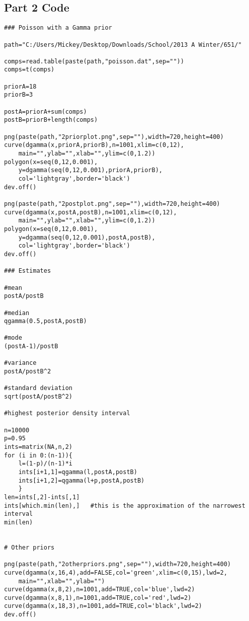 \documentclass[12pt]{article}
\begin{document}
\subsection*{Part 2 Code}
\begin{scriptsize}
\begin{verbatim}
### Poisson with a Gamma prior

path="C:/Users/Mickey/Desktop/Downloads/School/2013 A Winter/651/"

comps=read.table(paste(path,"poisson.dat",sep=""))
comps=t(comps)

priorA=18
priorB=3

postA=priorA+sum(comps)
postB=priorB+length(comps)

png(paste(path,"2priorplot.png",sep=""),width=720,height=400)
curve(dgamma(x,priorA,priorB),n=1001,xlim=c(0,12),
    main="",ylab="",xlab="",ylim=c(0,1.2))
polygon(x=seq(0,12,0.001),
    y=dgamma(seq(0,12,0.001),priorA,priorB),
    col='lightgray',border='black')
dev.off()

png(paste(path,"2postplot.png",sep=""),width=720,height=400)
curve(dgamma(x,postA,postB),n=1001,xlim=c(0,12),
    main="",ylab="",xlab="",ylim=c(0,1.2))
polygon(x=seq(0,12,0.001),
    y=dgamma(seq(0,12,0.001),postA,postB),
    col='lightgray',border='black')
dev.off()

### Estimates

#mean
postA/postB

#median
qgamma(0.5,postA,postB)

#mode
(postA-1)/postB

#variance
postA/postB^2

#standard deviation
sqrt(postA/postB^2)

#highest posterior density interval

n=10000
p=0.95
ints=matrix(NA,n,2)
for (i in 0:(n-1)){
    l=(1-p)/(n-1)*i
    ints[i+1,1]=qgamma(l,postA,postB)
    ints[i+1,2]=qgamma(l+p,postA,postB)
    }
len=ints[,2]-ints[,1]
ints[which.min(len),]	#this is the approximation of the narrowest interval
min(len)


# Other priors

png(paste(path,"2otherpriors.png",sep=""),width=720,height=400)
curve(dgamma(x,16,4),add=FALSE,col='green',xlim=c(0,15),lwd=2,
    main="",xlab="",ylab="")
curve(dgamma(x,8,2),n=1001,add=TRUE,col='blue',lwd=2)
curve(dgamma(x,8,1),n=1001,add=TRUE,col='red',lwd=2)
curve(dgamma(x,18,3),n=1001,add=TRUE,col='black',lwd=2)
dev.off()
\end{verbatim}
\end{scriptsize}
\end{document}
